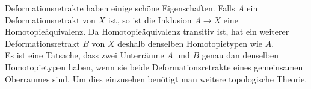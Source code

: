 Deformationsretrakte haben einige schöne Eigenschaften. Falls $A$ ein
Deformationsretrakt von $X$ ist, so ist die Inklusion $A \rightarrow X$ eine
Homotopieäquivalenz. Da Homotopieäquivalenz transitiv ist, hat ein weiterer
Deformationsretrakt $B$ von $X$ deshalb denselben Homotopietypen wie $A$. \\
Es ist eine Tatsache, dass zwei Unterräume $A$ und $B$ genau dan denselben 
Homotopietypen haben, wenn sie beide Deformationsretrakte eines gemeinsamen 
Oberraumes sind. Um dies einzusehen benötigt man weitere topologische 
Theorie.